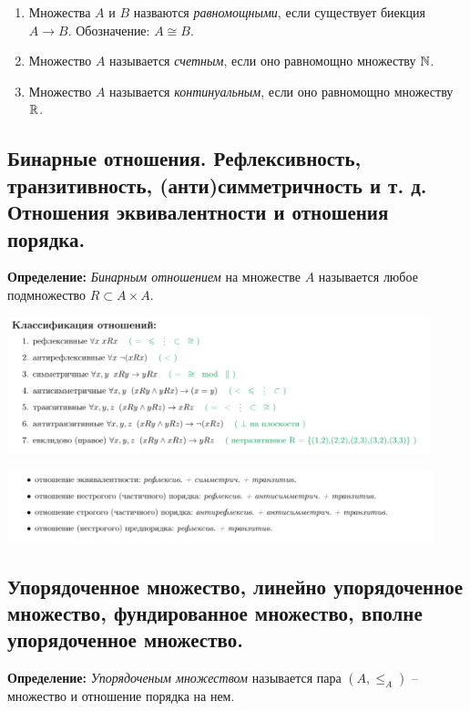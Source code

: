 \begin{enumerate}
    \item Множества $A$ и $B$ назваются \textit{равномощными}, если существует биекция $A \to B$. Обозначение: $A \cong B$.
    \item Множество $A$ называется \textit{счетным}, если оно равномощно множеству $\mathbb{N}$.
    \item Множество $A$ называется \textit{континуальным}, если оно равномощно множеству $\mathbb{R}$.
\end{enumerate}

\subsection{Бинарные отношения. Рефлексивность, транзитивность, (анти)симметричность и т. д. Отношения эквивалентности и отношения порядка.}

\textbf{Определение:} \textit{Бинарным отношением} на множестве $A$ называется любое подмножество $R \subset A \times A$.

\begin{center}
    \includegraphics[width = 0.92\textwidth]{images/2 (определения)_m22.PNG}

    \includegraphics[width = 0.93\textwidth]{images/2 (определения)_m23.PNG}
\end{center}

\subsection{Упорядоченное множество, линейно упорядоченное множество, фундированное множество, вполне упорядоченное множество.}

\textbf{Определение:} \textit{Упорядоченым множеством} называется пара $(A, \leq_A)$ -- множество и отношение порядка на нем.

